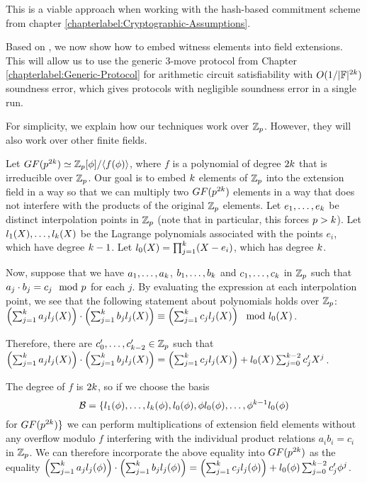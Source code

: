 This is a viable approach when working with the hash-based commitment scheme from chapter \ref{chapterlabel:Cryptographic-Assumptions}.

Based on \cite{BaumBCPGL18}, we now show how to embed witness elements into field extensions. This will allow us to use the generic 3-move protocol from Chapter \ref{chapterlabel:Generic-Protocol} for arithmetic circuit satisfiability with $O(1/|\mathbb{F}|^{2k})$ soundness error, which gives protocols with negligible soundness error in a single run.

For simplicity, we explain how our techniques work over $\mathbb{Z}_p$. However, they will also work over other finite fields.

Let $GF(p^{2k}) \simeq \mathbb{Z}_p[\phi]/\langle f(\phi) \rangle$, where $f$ is a polynomial of degree $2k$ that is irreducible over $\mathbb{Z}_p$. Our goal is to embed $k$ elements of $\mathbb{Z}_p$ into the extension field in a way so that we can multiply two $GF(p^{2k})$ elements in a way that does not interfere with the products of the original $\mathbb{Z}_p$ elements. Let $e_1,\ldots,e_k$ be distinct interpolation points in $\mathbb{Z}_p$ (note that in particular, this forces $p>k$). Let $l_1(X),\ldots,l_k(X)$ be the Lagrange polynomials associated with the points $e_i$, which have degree $k-1$. Let $l_0(X) = \prod_{j=1}^k (X-e_i)$, which has degree $k$.

Now, suppose that we have $a_1,\ldots,a_k$, $b_1,\ldots,b_k$ and $c_1,\ldots,c_k$ in $\mathbb{Z}_p$ such that $a_j \cdot b_j = c_j \mod {p}$ for each $j$. By evaluating the expression at each interpolation point, we see that the following statement about polynomials holds over $\mathbb{Z}_p$: $ \left( \sum_{j=1}^k a_j l_j(X) \right) \cdot \left( \sum_{j=1}^k b_j l_j(X) \right) \equiv \left( \sum_{j=1}^k c_j l_j(X) \right) \mod l_0(X)$.

Therefore, there are $c'_0,\ldots,c'_{k-2}\in \mathbb{Z}_p$ such that $\left( \sum_{j=1}^k a_j l_j(X) \right) \cdot \left( \sum_{j=1}^k b_j l_j(X) \right) = \left( \sum_{j=1}^k c_j l_j(X) \right) + l_0(X) \sum_{j=0}^{k-2} c'_j X^j$.

The degree of $f$ is $2k$, so if we choose the basis
\[\mathcal{B} = \{ l_1(\phi),\ldots,l_k(\phi),l_0(\phi),\phi l_0(\phi),\ldots,\phi^{k-1} l_0(\phi)\]
for $GF(p^{2k}) \}$ we can perform multiplications of extension field elements without any overflow modulo $f$ interfering with the individual product relations $a_i b_i = c_i$ in $\mathbb{Z}_p$. We can therefore incorporate the above equality into $GF(p^{2k})$ as the equality $\left( \sum_{j=1}^k a_j l_j(\phi) \right) \cdot \left( \sum_{j=1}^k b_j l_j(\phi) \right) = \left( \sum_{j=1}^k c_j l_j(\phi) \right) + l_0(\phi) \sum_{j=0}^{k-2} c'_j \phi^j$.

